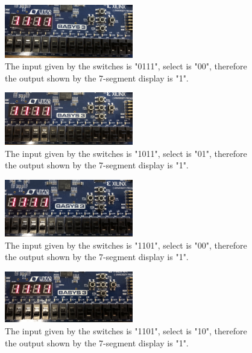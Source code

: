 \documentclass[11pt]{article}
\begin{document}
\begin{figure}[H]
\begin{center}
	\includegraphics[width=0.5\textwidth]{../report-images/Part2/IMG_3108.jpg}
	\caption{\label{fig:p2img10}The input given by the switches is "0111", select is "00", therefore the output shown by the 7-segment display is "1".}
\end{center}
\end{figure}

\begin{figure}[H]
\begin{center}
	\includegraphics[width=0.5\textwidth]{../report-images/Part2/IMG_3112.jpg}
	\caption{\label{fig:p2img11}The input given by the switches is "1011", select is "01", therefore the output shown by the 7-segment display is "1".}
\end{center}
\end{figure}

\begin{figure}[H]
\begin{center}
	\includegraphics[width=0.5\textwidth]{../report-images/Part2/IMG_3114.jpg}
	\caption{\label{fig:p2img12}The input given by the switches is "1101", select is "00", therefore the output shown by the 7-segment display is "1".}
\end{center}
\end{figure}

\begin{figure}[H]
\begin{center}
	\includegraphics[width=0.5\textwidth]{../report-images/Part2/IMG_3116.jpg}
	\caption{\label{fig:p2img13}The input given by the switches is "1101", select is "10", therefore the output shown by the 7-segment display is "1".}
\end{center}
\end{figure}
\end{document}
